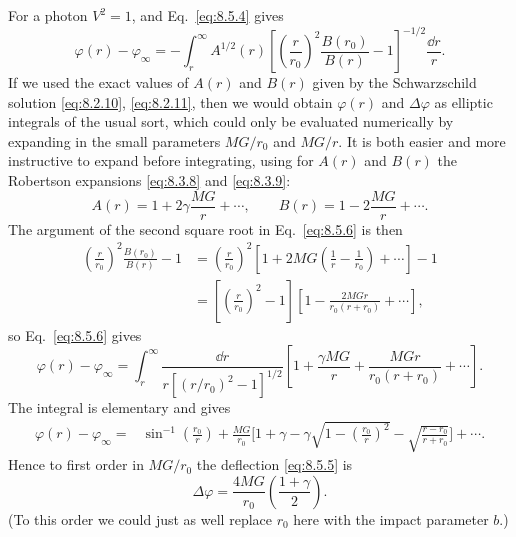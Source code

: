 For a photon \(V^2=1\), and Eq.~\eqref{eq:8.5.4} gives
\begin{equation}
  \varphi(r)-\varphi_\infty
  =
  -\int_r^\infty
  A^{1/2}(r)
  \left[
    \left(\frac{r}{r_0}\right)^2
    \frac{B(r_0)}{B(r)}-1
  \right]^{-1/2}
  \frac{\dd r}{r}.
  \tag{8.5.6}\label{eq:8.5.6}
\end{equation}
If we used the exact values of \(A(r)\) and \(B(r)\) given by the
Schwarzschild solution \eqref{eq:8.2.10}, \eqref{eq:8.2.11}, then we
would obtain \(\varphi(r)\) and \(\Delta\varphi\) as elliptic integrals of
the usual sort, which could only be evaluated numerically by expanding in
the small parameters \(MG/r_0\) and \(MG/r\). It is both easier and more
instructive to expand before integrating, using for \(A(r)\) and \(B(r)\)
the Robertson expansions \eqref{eq:8.3.8} and \eqref{eq:8.3.9}:
\[
  A(r)=1+2\gamma\frac{MG}{r}+\cdots,
\qquad
  B(r)=1-2\frac{MG}{r}+\cdots.
\]
The argument of the second square root in Eq.~\eqref{eq:8.5.6} is then
\[
  \begin{split}
  \left(\frac{r}{r_0}\right)^2\frac{B(r_0)}{B(r)}-1
  &=
  \left(\frac{r}{r_0}\right)^2
  \left[
    1+2MG\left(\frac1r-\frac1{r_0}\right)+\cdots
  \right]-1
  \\
  &=
  \left[\left(\frac{r}{r_0}\right)^2-1\right]
  \left[1-\frac{2MGr}{r_0(r+r_0)}+\cdots\right],
  \end{split}
\]
so Eq.~\eqref{eq:8.5.6} gives
\[
  \varphi(r)-\varphi_\infty
  =
  \int_r^\infty
  \frac{\dd r}{r[(r/r_0)^2-1]^{1/2}}
  \left[
    1+\frac{\gamma MG}{r}
    +\frac{MGr}{r_0(r+r_0)}+\cdots
  \right].
\]
The integral is elementary and gives
\begin{equation}
  \begin{split}
  \varphi(r)-\varphi_\infty
  ={}&
  \sin^{-1}\left(\frac{r_0}{r}\right)
  +\frac{MG}{r_0}
  \biggl[
    1+\gamma
    -\gamma\sqrt{1-\left(\frac{r_0}{r}\right)^2}
    -\sqrt{\frac{r-r_0}{r+r_0}}
  \biggr]
  +\cdots.
  \end{split}
  \tag{8.5.7}\label{eq:8.5.7}
\end{equation}
Hence to first order in \(MG/r_0\) the deflection
\eqref{eq:8.5.5} is
\begin{equation}
  \Delta\varphi
  =
  \frac{4MG}{r_0}\left(\frac{1+\gamma}{2}\right).
  \tag{8.5.8}\label{eq:8.5.8}
\end{equation}
(To this order we could just as well replace \(r_0\) here with the impact
parameter \(b\).)

